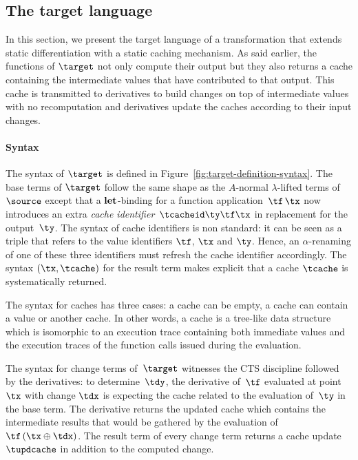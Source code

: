 \subsection{The target language \target}
\label{sec:targetlanguage}

In this section, we present the target language of a transformation
that extends static differentiation with a static caching mechanism.
As said earlier, the functions of $\target$ not only compute their
output but they also returns a cache containing the intermediate
values that have contributed to that output. This cache is transmitted
to derivatives to build changes on top of intermediate values with no
recomputation and derivatives update the caches according to their
input changes. 

\paragraph{Syntax}
The syntax of $\target$ is defined in
Figure~\ref{fig:target-definition-syntax}. The base terms of $\target$
follow the same shape as the $A$-normal $\lambda$-lifted terms of
$\source$ except that a $\bf let$-binding for a function
application~$\tf\,\tx$ now introduces an extra \textit{cache
  identifier}~$\tcacheid\ty\tf\tx$ in replacement for the
output~$\ty$. The syntax of cache identifiers is non standard: it can
be seen as a triple that refers to the value identifiers $\tf$, $\tx$
and $\ty$. Hence, an $\alpha$-renaming of one of these three
identifiers must refresh the cache identifier accordingly. The syntax
$(\tx, \tcache)$ for the result term makes explicit that a cache
$\tcache$ is systematically returned.



The syntax for caches has three cases: a cache can be empty, a cache
can contain a value or another cache. In other words, a cache is a
tree-like data structure which is isomorphic to an execution trace
containing both immediate values and the execution traces of the
function calls issued during the evaluation.

The syntax for change terms of~$\target$ witnesses the CTS
discipline followed by the derivatives: to determine~$\tdy$, the
derivative of~$\tf$ evaluated at point $\tx$ with change $\tdx$ is
expecting the cache related to the evaluation of~$\ty$ in the base
term. The derivative returns the updated cache which contains the
intermediate results that would be gathered by the evaluation
of~$\tf\,(\tx \oplus \tdx)$. The result term of every change term
returns a cache update $\tupdcache$ in addition to the computed
change.

